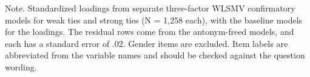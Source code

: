 \documentclass[
  12pt
]{article}
\begin{document}
Note. Standardized loadings from separate three-factor WLSMV confirmatory models for weak ties and strong ties (N = 1,258 each), with the baseline models for the loadings. The residual rows come from the antonym-freed models, and each has a standard error of .02. Gender items are excluded. Item labels are abbreviated from the variable names and should be checked against the question wording.
\end{document}
